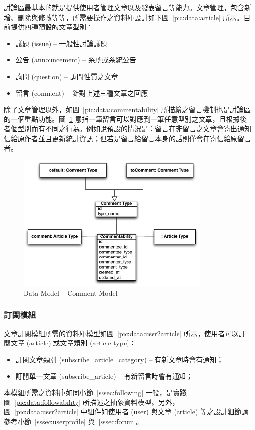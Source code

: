討論區最基本的就是提供使用者管理文章以及發表留言等能力。文章管理，包含新增、刪除與修改等等，所需要操作之資料庫設計如下圖~\ref{pic:data:article} 所示。目前提供四種預設的文章型別：
\begin{itemize}
\item 議題 (issue) -- 一般性討論議題
\item 公告 (announcement) -- 系所或系統公告
\item 詢問 (question) -- 詢問性質之文章
\item 留言 (comment) -- 針對上述三種文章之回應
\end{itemize}

除了文章管理以外，如圖~\ref{pic:data:commentability} 所描繪之留言機制也是討論區的一個重點功能。圖~\ref{pic:data:comment2article} 意指一筆留言可以對應到一筆任意型別之文章，且根據後者個型別而有不同之行為。例如說預設的情況是：留言在非留言之文章會寄出通知信給原作者並且更新統計資訊；但若是留言給留言本身的話則僅會在寄信給原留言者。

\begin{figure}[H]
\centering
\includegraphics[width=0.85\textwidth]{img/comment2article.pdf}
\caption{Data Model -- Comment Model}
\label{pic:data:comment2article}
\end{figure}

\subsubsection{訂閱模組}
\label{sssec:subscription}

文章訂閱模組所需的資料庫模型如圖~\ref{pic:data:user2article} 所示，使用者可以訂閱文章 (article) 或文章類別 (article type)：
\begin{itemize}
\item{訂閱文章類別 (subscribe\_article\_category) -- 有新文章時會有通知；}
\item{訂閱單一文章 (subscribe\_article) -- 有新留言時會有通知；}
\end{itemize}
本模組所需之資料庫如同小節~\ref{sssec:following} 一般，是實踐圖~\ref{pic:data:followability} 所描述之抽象資料模型。另外，圖~\ref{pic:data:user2article} 中組件如使用者 (user) 與文章 (article) 等之設計細節請參考小節~\ref{sssec:userprofile} 與~\ref{sssec:forum}。

